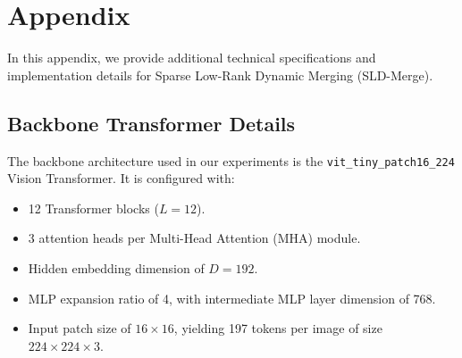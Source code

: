 \documentclass{article}
\theoremstyle{plain}
\theoremstyle{definition}
\theoremstyle{remark}
\begin{document}

\printAffiliationsAndNotice{\icmlEqualContribution}











\newpage
\appendix
\onecolumn
\section{Appendix}
\label{sec:appendix}

In this appendix, we provide additional technical specifications and implementation details for Sparse Low-Rank Dynamic Merging (SLD-Merge).

\subsection{Backbone Transformer Details}
The backbone architecture used in our experiments is the \texttt{vit\_tiny\_patch16\_224} Vision Transformer. It is configured with:
\begin{itemize}
    \item 12 Transformer blocks ($L=12$).
    \item 3 attention heads per Multi-Head Attention (MHA) module.
    \item Hidden embedding dimension of $D=192$.
    \item MLP expansion ratio of 4, with intermediate MLP layer dimension of 768.
    \item Input patch size of $16 \times 16$, yielding 197 tokens per image of size $224 \times 224 \times 3$.
\end{itemize}
\end{document}
